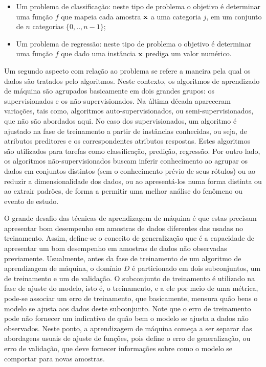 \begin{itemize}
\item Um problema de classificação: neste tipo de problema o objetivo é determinar uma função $f$ que mapeia cada amostra $\bf x$ a uma categoria $j$, em um conjunto de $n$ categorias $\{0,..,n-1\}$;
\item Um problema de regressão: neste tipo de problema o objetivo é determinar uma função $f$ que dado uma instância $\bf x$ prediga um valor numérico.
\end{itemize}

Um segundo aspecto com relação ao problema se refere a maneira pela qual os dados são tratados pelo algoritmos. Neste contexto, os algoritmos de aprendizado de máquina são agrupados basicamente em dois grandes grupos: os supervisionados e os não-supervisionados. Na última década apareceram variações, tais como, algoritmos auto-supervisionados, ou semi-supervisionados, que não são abordados aqui. No caso dos supervisionados, um algoritmo é ajustado na fase de treinamento a partir de instâncias conhecidas, ou seja, de atributos preditores e os correspondentes atributos respostas. Estes algoritmos são utilizados para tarefas como classificação, predição, regressão. Por outro lado, os algoritmos não-supervisionados buscam inferir conhecimento ao agrupar os dados em conjuntos distintos (sem o conhecimento prévio de seus rótulos) ou ao reduzir a dimensionalidade dos dados, ou ao apresentá-los numa forma distinta ou ao extrair padrões, de forma a permitir uma melhor análise do fenômeno ou evento de estudo.

O grande desafio das técnicas de aprendizagem de máquina é que estas precisam apresentar bom desempenho em amostras de dados diferentes das usadas no treinamento. Assim, define-se o conceito de generalização que é a capacidade de apresentar um bom desempenho em amostras de dados não observadas previamente. Usualmente, antes da fase de treinamento de um algoritmo de aprendizagem de máquina, o domínio $D$ é particionado em dois subconjuntos, um de treinamento e um de validação. O subconjunto de treinamento é utilizado na fase de ajuste do modelo, isto é, o treinamento, e a ele por meio de uma métrica, pode-se associar um erro de treinamento, que basicamente, mensura quão bens o modelo se ajusta aos dados deste subconjunto. Note que o erro de treinamento pode não fornecer um indicativo de quão bem o modelo se ajusta a dados não observados. Neste ponto, a aprendizagem de máquina começa a ser separar das abordagens usuais de ajuste de funções, pois define o erro de generalização, ou erro de validação, que deve fornecer informações sobre como o modelo se comportar para novas amostras.

